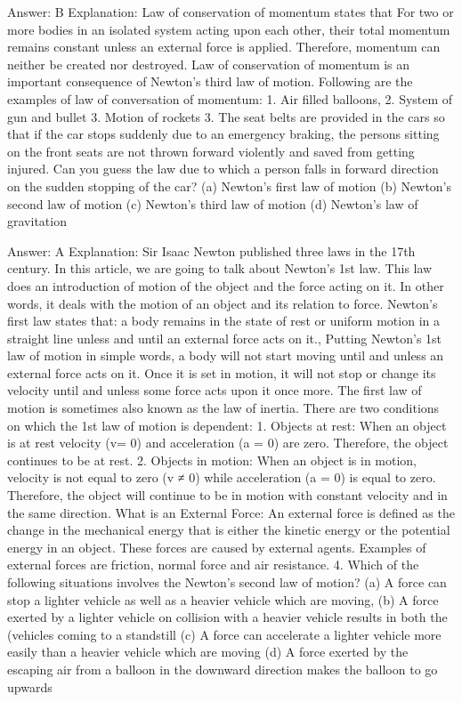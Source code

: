 Answer: B
Explanation: Law of conservation of momentum states that For two or more bodies in an isolated system acting upon each other, their total momentum remains constant unless an external force is applied. Therefore, momentum can neither be created nor destroyed. Law of conservation of momentum is an important consequence of Newton’s third law of motion. Following are the examples of law of conversation of momentum: 1. Air filled balloons,  2. System of gun and bullet 3. Motion of rockets 3. The seat belts are provided in the cars so that if the car stops suddenly due to an emergency braking, the persons sitting on the front seats are not thrown forward violently and saved from getting injured. Can you guess the law due to which a person falls in forward direction on the sudden stopping of the car? (a) Newton’s first law of motion (b) Newton’s second law of motion (c) Newton’s third law of motion (d) Newton’s law of gravitation 

Answer: A
Explanation: Sir Isaac Newton published three laws in the 17th century. In this article, we are going to talk about Newton’s 1st law. This law does an introduction of motion of the object and the force acting on it. In other words, it deals with the motion of an object and its relation to force. Newton’s first law states that: a body remains in the state of rest or uniform motion in a straight line unless and until an external force acts on it.,  Putting Newton’s 1st law of motion in simple words, a body will not start moving until and unless an external force acts on it. Once it is set in motion, it will not stop or change its velocity until and unless some force acts upon it once more. The first law of motion is sometimes also known as the law of inertia. There are two conditions on which the 1st law of motion is dependent: 1. Objects at rest: When an object is at rest velocity (v= 0) and acceleration (a = 0) are zero. Therefore, the object continues to be at rest. 2. Objects in motion: When an object is in motion, velocity is not equal to zero (v ≠ 0) while acceleration (a = 0) is equal to zero. Therefore, the object will continue to be in motion with constant velocity and in the same direction. What is an External Force: An external force is defined as the change in the mechanical energy that is either the kinetic energy or the potential energy in an object. These forces are caused by external agents. Examples of external forces are friction, normal force and air resistance. 4. Which of the following situations involves the Newton’s second law of motion? (a) A force can stop a lighter vehicle as well as a heavier vehicle which are moving,  (b) A force exerted by a lighter vehicle on collision with a heavier vehicle results in both the (vehicles coming to a standstill (c) A force can accelerate a lighter vehicle more easily than a heavier vehicle which are moving (d) A force exerted by the escaping air from a balloon in the downward direction makes the balloon to go upwards 

